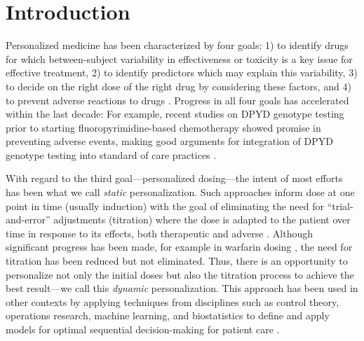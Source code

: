 \section{Introduction}

Personalized medicine has been characterized by four goals: 1) to identify drugs for which between-subject variability in effectiveness or toxicity is a key issue for effective treatment, 2) to identify predictors which may explain this variability, 3) to decide on the right dose of the right drug by considering these factors, and 4) to prevent adverse reactions to drugs \cite{morse2015personalized}.  Progress in all four goals has accelerated within the last decade: For example, recent studies on DPYD genotype testing prior to starting fluoropyrimidine-based chemotherapy showed promise in preventing adverse events, making good arguments for integration of DPYD genotype testing into standard of care practices \cite{wigle2019prospective}.  

With regard to the third goal---personalized dosing---the intent of most efforts has been what we call \textit{static} personalization. Such approaches inform dose at one point in time (usually induction) with the goal of eliminating the need for ``trial-and-error'' adjustments (titration) where the dose is adapted to the patient over time in response to its effects, both therapeutic and adverse \cite{morse2015personalized}. Although significant progress has been made, for example in warfarin dosing \cite{gong2011prospective}, the need for titration has been reduced but not eliminated. Thus, there is an opportunity to personalize not only the initial doses but also the titration process to achieve the best result---we call this \textit{dynamic} personalization. This approach has been used in other contexts by applying techniques from disciplines such as control theory, operations research, machine learning, and biostatistics to define and apply models for optimal sequential decision-making for patient care \cite{zhang2021identifying, engelhardt2021importance}.

